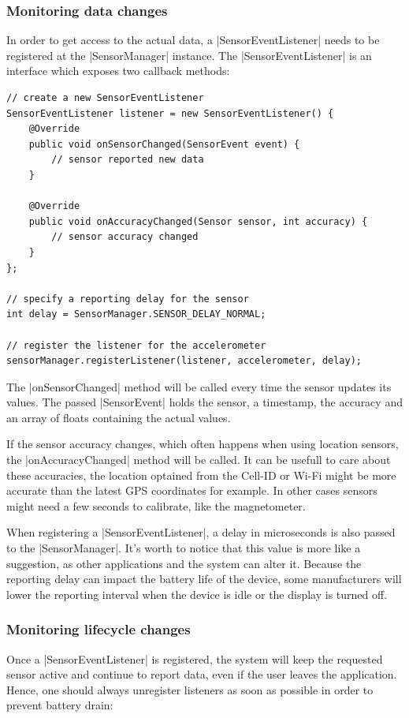 \subsubsection{Monitoring data changes}
\label{sec:implementation:monitoringdatachanges}
In order to get access to the actual data, a |SensorEventListener|\cite{androiddocs:sensoreventlistener} needs to be registered at the |SensorManager| instance. The |SensorEventListener| is an interface which exposes two callback methods:

\begin{lstlisting}[label=registersensoreventlistener]
// create a new SensorEventListener
SensorEventListener listener = new SensorEventListener() {
	@Override
	public void onSensorChanged(SensorEvent event) {
		// sensor reported new data
	}

	@Override
	public void onAccuracyChanged(Sensor sensor, int accuracy) {
		// sensor accuracy changed
	}
};

// specify a reporting delay for the sensor
int delay = SensorManager.SENSOR_DELAY_NORMAL;

// register the listener for the accelerometer
sensorManager.registerListener(listener, accelerometer, delay);
\end{lstlisting}

The |onSensorChanged| method will be called every time the sensor updates its values. The passed |SensorEvent|\cite{androiddocs:sensorevent} holds the sensor, a timestamp, the accuracy and an array of floats containing the actual values.

If the sensor accuracy changes, which often happens when using location sensors, the |onAccuracyChanged| method will be called.
It can be usefull to care about these accuracies, the location optained from the Cell-ID or Wi-Fi might be more accurate than the latest GPS coordinates for example.
In other cases sensors might need a few seconds to calibrate, like the magnetometer.

When registering a |SensorEventListener|, a delay in microseconds is also passed to the |SensorManager|.
It's worth to notice that this value is more like a suggestion, as other applications and the system can alter it.
Because the reporting delay can impact the battery life of the device, some manufacturers will lower the reporting interval when the device is idle or the display is turned off.

\clearpage

\subsubsection{Monitoring lifecycle changes}
\label{sec:implementation:monitoringlifecyclechanges}
Once a |SensorEventListener| is registered, the system will keep the requested sensor active and continue to report data, even if the user leaves the application.
Hence, one should always unregister listeners as soon as possible in order to prevent battery drain:

